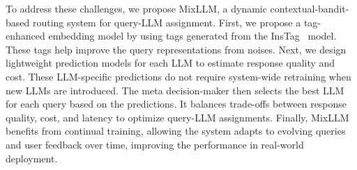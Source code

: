 



To address these challenges, we propose MixLLM, a dynamic contextual-bandit-based routing system for query-LLM assignment.
First, we propose a tag-enhanced embedding model by using tags generated from the InsTag~\cite{lu2023instag} model. These tags help improve the query representations from noises.
Next, we design lightweight prediction models for each LLM to estimate response quality and cost. These LLM-specific predictions do not require system-wide retraining when new LLMs are introduced.
The meta decision-maker then selects the best LLM for each query based on the predictions. It balances trade-offs between response quality, cost, and latency to optimize query-LLM assignments.
Finally, MixLLM benefits from continual training, allowing the system adapts to evolving queries and user feedback over time, improving the performance in real-world deployment.

